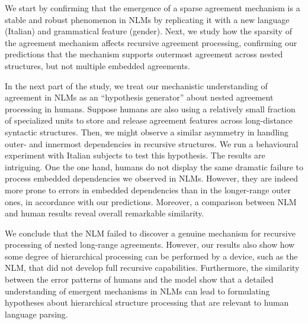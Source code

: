We  start by confirming that the emergence of a sparse
agreement mechanism is a stable and robust phenomenon in NLMs by
replicating it with a new language (Italian) and grammatical feature
(gender). Next, we study how the sparsity of the agreement mechanism
affects recursive agreement processing, confirming our predictions
that the mechanism supports outermost agreement across nested
structures, but not multiple embedded agreements.

In the next part of the study, we treat our mechanistic understanding of
agreement in NLMs as an ``hypothesis generator''
\citep{Cichy:Kaiser:2019} about nested agreement processing in
humans. Suppose humans are also using a relatively small fraction of specialized units
to store and release agreement features across long-distance syntactic
structures. Then, we might observe a similar asymmetry in handling
outer- and innermost dependencies in recursive structures. We run a
behavioural experiment with Italian subjects to test this
hypothesis. The results are intriguing. One the one hand, humans do
not display the same dramatic failure to process embedded dependencies we observed in NLMs. However, they are indeed more prone to errors in embedded dependencies than in the longer-range outer ones, in accordance with our predictions. Moreover, a comparison between NLM and human results reveal overall remarkable similarity. 

We conclude that the NLM failed to discover a genuine mechanism for recursive processing of nested long-range agreements. However, our results also show how some degree of hierarchical processing can be performed by a device, such as the NLM, that did not develop full recursive capabilities. Furthermore, the similarity between the error patterns of humans and the model show that %
a detailed understanding of emergent mechanisms in NLMs can lead to formulating hypotheses about hierarchical structure processing that are relevant to human language parsing.



